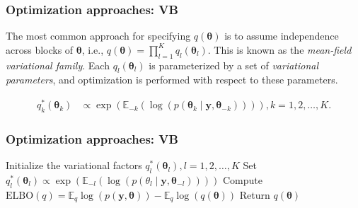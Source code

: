 \documentclass[12pt, compress]{beamer}
\begin{document}
\begin{frame}
	\frametitle{Optimization approaches: VB}
The most common approach for specifying $q(\boldsymbol{\theta})$ is to assume independence across blocks of $\boldsymbol{\theta}$, i.e., $q(\boldsymbol{\theta}) = \prod_{l=1}^K q_l(\boldsymbol{\theta}_l)$. This is known as the \textit{mean-field variational family}. Each $q_l(\boldsymbol{\theta}_l)$ is parameterized by a set of \textit{variational parameters}, and optimization is performed with respect to these parameters.

\begin{align}\label{eq:VB3}
	q_k^*(\boldsymbol{\theta}_k)
	&\propto \exp\left(\mathbb{E}_{-k}(\log\left(p(\boldsymbol{\theta}_{k}\mid\boldsymbol{y},\boldsymbol\theta_{-k})\right))\right), k=1,2,\dots,K.
\end{align}
\end{frame}

\begin{frame}
	\frametitle{Optimization approaches: VB}
\begin{algorithm}[H]
	\caption{Variational Bayes: Coordinate ascent variational inference}\label{VB0}
	\begin{algorithmic}[1]
		\State Initialize the variational factors $q_l^*(\boldsymbol{\theta}_l), l=1,2,\dots,K$
				\State Set $q_l^*(\boldsymbol{\theta}_l)\propto \exp\left(\mathbb{E}_{-l}(\log\left(p({\theta}_{l}\mid\boldsymbol{y},\boldsymbol\theta_{-l})\right))\right)$
			\EndFor
		\State Compute $\text{ELBO}(q)=\mathbb{E}_q\log(p(\boldsymbol{y}, \boldsymbol{\theta}))-\mathbb{E}_q\log(q(\boldsymbol{\theta}))$
		\EndWhile 
		\State Return $q(\boldsymbol{\theta})$ 
	\end{algorithmic}
\end{algorithm}

\end{frame}
\end{document}
